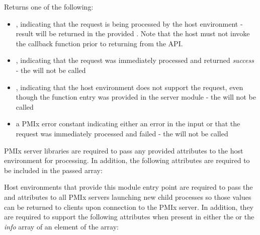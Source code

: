 \begin{arglist}
\end{arglist}

Returns one of the following:

\begin{itemize}
    \item {}, indicating that the request is being processed by the host environment - result will be returned in the provided . Note that the host must not invoke the callback function prior to returning from the \ac{API}.
    \item {}, indicating that the request was immediately processed and returned \textit{success} - the  will not be called
    \item {}, indicating that the host environment does not support the request, even though the function entry was provided in the server module - the  will not be called
    \item a PMIx error constant indicating either an error in the input or that the request was immediately processed and failed - the  will not be called
\end{itemize}

\reqattrstart
\ac{PMIx} server libraries are required to pass any provided attributes to the host environment for processing. In addition, the following attributes are required to be included in the passed  array:


\divider

Host environments that provide this module entry point are required to pass the  and  attributes to all \ac{PMIx} servers launching new child processes so those values can be returned to clients upon connection to the \ac{PMIx} server. In addition, they are required to support the following attributes when present in either the  or the \textit{info} array of an element of the  array:

